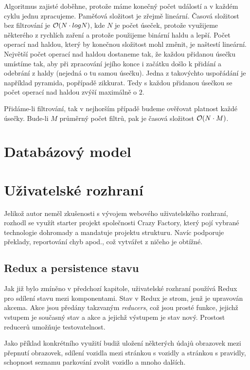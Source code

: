 Algoritmus zajisté doběhne, protože máme konečný počet událostí a v každém cyklu jednu zpracujeme.
Paměťová složitost je zřejmě lineární. Časová složitost bez filtrování je ${\cal O}(N\cdot{logN})$, kde $N$ je 
počet úseček, protože
využijeme některého z rychlích zaření a protože použijeme binární haldu a lepší. Počet operací nad haldou,
který by konečnou složitost mohl změnit, je naštestí lineární. Největší počet operací nad haldou dostaneme tak, že
každou přidanou úsečku umístíme tak, aby při zpracování jejího konce i začátku došlo k přidání a odebrání z haldy
(nejedná o tu samou úsečku). Jedna z takovýchto uspořádání je například pyramida, popřípadě zikkurat.
Tedy s každou přidanou úsečkou se počet operací nad haldou zvýší maximálně o $2$.

Přidáme-li filtrování, tak v nejhorším případě budeme ověřovat platnost každé úsečky. Bude-li $M$ průměrný počet
filtrů, pak je časová složitost ${\cal O}(N\cdot{M})$. 

\section{Databázový model}

\section{Uživatelské rozhraní}

Jelikož autor neměl zkušenosti s vývojem webového uživatelského rozhraní, rozhodl se využít starter projekt
společnosti Crazy Factory, který pojí vybrané technologie dohromady a mandatuje projektu strukturu.
Navíc podporuje překlady, reportování chyb apod., což vytvářet z ničeho je obtížné. \citep[viz][]{CFProj}

\subsection{Redux a persistence stavu}

Jak již bylo zmíněno v předchozí kapitole, uživatelské rozhraní používá Redux pro sdílení stavu mezi komponentami.
Stav v Redux je strom, jenž je upravován akcema. Akce jsou předány takzvaným \textit{reducers}, což jsou prosté funkce,
jejichž vstupem je současný stav a akce a jejichž výstupem je stav nový. \citep[viz][]{ReduxCore}
Prostost reducerů umožňuje testovatelnost.

Jako příklad konkrétního využití budiž uložení některých údajů obrazovek mezi přepnutí obrazovek,
sdílení vozidla mezi stránkou s vozidly a stránkou s pravidly, schopnost seznamu parkování zvolit vozidlo a mnoho dalších.

